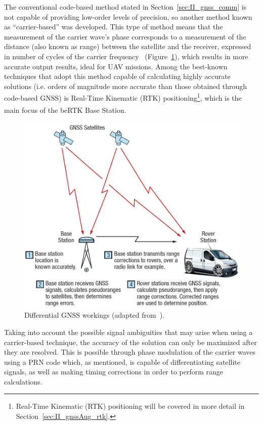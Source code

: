 The conventional code-based method stated in Section~\ref{sec:II_gnss_comm} is not capable of providing low-order levels of precision, so another method known as ``carrier-based'' was developed.
This type of method means that the measurement of the carrier wave's phase corresponds to a measurement of the distance (also known as range) between the satellite and the receiver, expressed in number of cycles of the carrier frequency~\cite{inside_GNSS} (Figure~\ref{fig:dgnss_corrections}), which results in more accurate output results, ideal for UAV missions.
Among the best-known techniques that adopt this method capable of calculating highly accurate solutions (i.e. orders of magnitude more accurate than those obtained through code-based GNSS) is Real-Time Kinematic (RTK) positioning\footnote{Real-Time Kinematic (RTK) positioning will be covered in more detail in Section~\ref{sec:II_gnssAug_rtk}.}, which is the main focus of the beRTK\textsuperscript{\textregistered} Base Station.
\begin{figure}[h]
	\centering
	\includegraphics[width=1.0\textwidth]{Chapters/Figures/dgnss_corrections.png}
	\caption{Differential GNSS workings (adapted from~\cite{novatel_gnss}).}
	\label{fig:dgnss_corrections}
\end{figure}

Taking into account the possible signal ambiguities that may arise when using a carrier-based technique, the accuracy of the solution can only be maximized after they are resolved. This is possible through phase modulation of the carrier waves using a PRN code which, as mentioned, is capable of differentiating satellite signals, as well as making timing corrections in order to perform range calculations.

